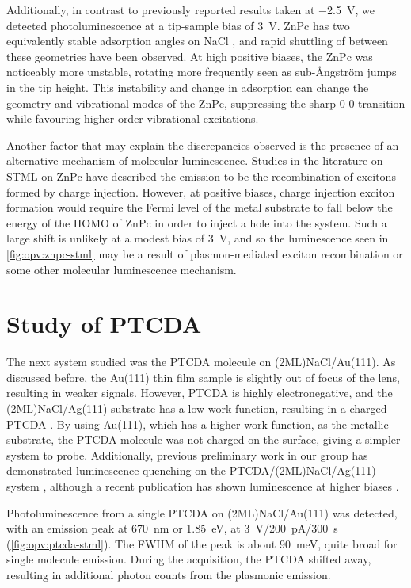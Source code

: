 Additionally, in contrast to previously reported results taken at \SI{-2.5}{V}, we detected photoluminescence at a tip-sample bias of \SI{3}{V}. ZnPc has two equivalently stable adsorption angles on NaCl \citep{Miwa2016}, and rapid shuttling of between these geometries have been observed. At high positive biases, the ZnPc was noticeably more unstable, rotating more frequently seen as sub-\AA ngstr\"om jumps in the tip height. This instability and change in adsorption can change the geometry and vibrational modes of the ZnPc, suppressing the sharp 0-0 transition while favouring higher order vibrational excitations. 

Another factor that may explain the discrepancies observed is the presence of an alternative mechanism of molecular luminescence. Studies in the literature on \ac{STML} on ZnPc have described the emission to be the recombination of excitons formed by charge injection. However, at positive biases, charge injection exciton formation would require the Fermi level of the metal substrate to fall below the energy of the \ac{HOMO} of ZnPc in order to inject a hole into the system. Such a large shift is unlikely at a modest bias of \SI{3}{V}, and so the luminescence seen in \autoref{fig:opv:znpc-stml} may be a result of plasmon-mediated exciton recombination or some other molecular luminescence mechanism.








\section{Study of PTCDA}

The next system studied was the \ac{PTCDA} molecule on (2ML)NaCl/Au(111). As discussed before, the Au(111) thin film sample is slightly out of focus of the lens, resulting in weaker signals. However, \ac{PTCDA} is highly electronegative, and the (2ML)NaCl/Ag(111) substrate has a low work function, resulting in a charged PTCDA \citep{cochrane2017single,cochrane2018molecularly}. By using Au(111), which has a higher work function, as the metallic substrate, the PTCDA molecule was not charged on the surface, giving a simpler system to probe. Additionally, previous preliminary work in our group has demonstrated luminescence quenching on the PTCDA/(2ML)NaCl/Ag(111) system \citep{roussy2016coupling}, although a recent publication has shown luminescence at higher biases \citep{Kimura2019}.

Photoluminescence from a single PTCDA on (2ML)NaCl/Au(111) was detected, with an emission peak at \SI{670}{nm} or \SI{1.85}{eV}, at \SI{3}{V}/\SI{200}{pA}/\SI{300}{s} (\autoref{fig:opv:ptcda-stml}). The \ac{FWHM} of the peak is about \SI{90}{meV}, quite broad for single molecule emission. During the acquisition, the PTCDA shifted away, resulting in additional photon counts from the plasmonic emission.


